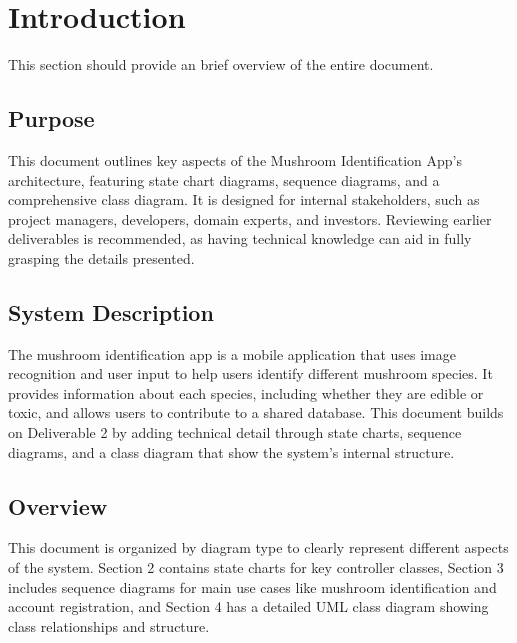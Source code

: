 \documentclass[]{article}
\begin{document}
\section{Introduction}
\label{sec:introduction}

This section should provide an brief overview of the entire document.

\subsection{Purpose}
\label{sub:purpose}
This document outlines key aspects of the Mushroom Identification App's architecture, featuring state chart diagrams, sequence diagrams, and a comprehensive class diagram.
It is designed for internal stakeholders, such as project managers, developers, domain experts, and investors. Reviewing earlier deliverables is recommended, as having technical knowledge can aid in fully grasping the details presented.


\subsection{System Description}
\label{sub:system_description}
The mushroom identification app is a mobile application that uses image recognition and user input to help users identify different mushroom species. It provides information about each species, including whether they are edible or toxic, and allows users to contribute to a shared database. This document builds on Deliverable 2 by adding technical detail through state charts, sequence diagrams, and a class diagram that show the system’s internal structure.


\subsection{Overview}
\label{sub:overview}
This document is organized by diagram type to clearly represent different aspects of the system. Section 2 contains state charts for key controller classes, Section 3 includes sequence diagrams for main use cases like mushroom identification and account registration, and Section 4 has a detailed UML class diagram showing class relationships and structure.



\end{document}
